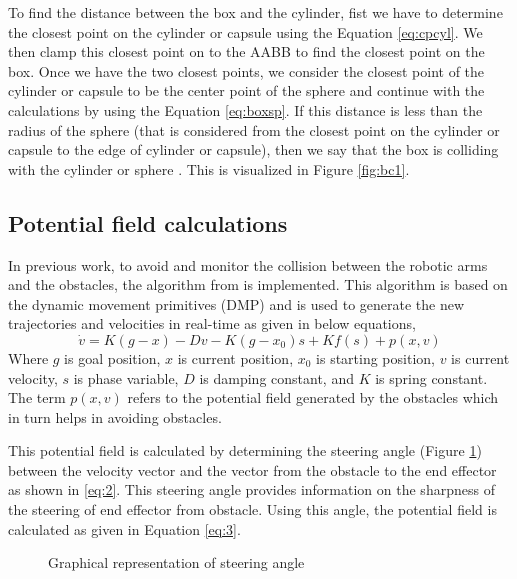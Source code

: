 \documentclass[a4paper, 11.5pt, conference]{ieeeconf}      %
\begin{document}
To find the distance between the box and the cylinder, fist we have to determine the closest point on the cylinder or capsule using the Equation \ref{eq:cpcyl}. We then clamp this closest point on to the AABB to find the closest point on the box. Once we have the two closest points, we consider the closest point of the cylinder or capsule to be the center point of the sphere and continue with the calculations by using the Equation \ref{eq:boxsp}. If this distance is less than the radius of the sphere (that is considered from the closest point on the cylinder or capsule to the edge of cylinder or capsule), then we say that the box is colliding with the cylinder or sphere \cite{3ddet}. This is visualized in Figure \ref{fig:bc1}.
\subsection{Potential field calculations}
In previous work, to avoid and monitor the collision between the robotic arms and the obstacles, the algorithm from \cite{Hoffmann} is implemented. This algorithm is based on the dynamic movement primitives (DMP) and is used to generate the new trajectories and velocities in real-time as given in below equations,
\begin{equation} \label{eq:1}
	\dot{v} = K ( g - x ) - D v - K (g - x_0) s + K f(s) + p(x, v)
\end{equation}
Where $g$ is goal position, $x$ is current position, $x_0$ is starting position, $v$ is current velocity, $s$ is phase variable, $D$ is damping constant, and $K$ is spring constant. The term $p(x,v)$ refers to the potential field generated by the obstacles which in turn helps in avoiding obstacles.

This potential field is calculated by determining the steering angle (Figure \ref{steering_image}) between the velocity vector and the vector from the obstacle to the end effector as shown in \ref{eq:2}. This steering angle provides information on the sharpness of the steering of end effector from obstacle. Using this angle, the potential field is calculated as given in Equation \ref{eq:3}.

\begin{figure}[H]
	\centering
	\caption{Graphical representation of steering angle \cite{Hoffmann}}
	\label{steering_image}
\end{figure}
\end{document}
